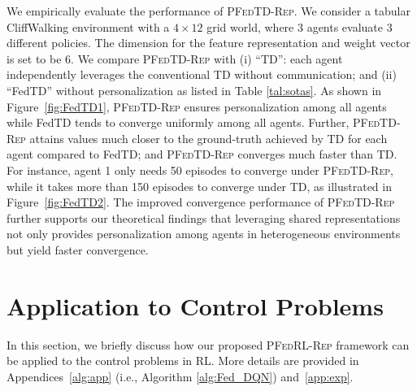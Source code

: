 \documentclass{article} %
\theoremstyle{plain}
\theoremstyle{definition}
\theoremstyle{remark}
\newcommand{\FedRL}{\textsc{PFedRL-Rep}\xspace}
\newcommand{\FedTD}{\textsc{PFedTD-Rep}\xspace}
\begin{document}
{We empirically evaluate the performance of \FedTD. We consider a tabular CliffWalking environment \citep{brockman2016openai} with a $4\times 12$ grid world, where 3 agents evaluate 3 different policies. The dimension for the feature representation and weight vector is set to be $6$. We compare \FedTD with (i) ``TD'': each agent independently leverages the conventional TD without communication; and (ii) ``FedTD'' without personalization \citep{khodadadian2022federated,dal2023federated} as listed in Table \ref{tal:sotas}. As shown in Figure~\ref{fig:FedTD1}, \FedTD ensures personalization among all agents while FedTD tends to converge uniformly among all agents.
Further, \FedTD attains values much closer to the ground-truth achieved by TD for each agent compared to FedTD; and \FedTD converges much faster than TD. For instance, agent 1 only needs 50 episodes to converge under \FedTD, while it takes more than 150 episodes to converge under TD, as illustrated in Figure~\ref{fig:FedTD2}.
The improved convergence performance of \FedTD further supports our theoretical findings that leveraging shared representations not only provides personalization among agents in heterogeneous environments but yield faster convergence.  




  












\section{Application to Control Problems}\label{sec:application}
In this section, we briefly discuss how our proposed \FedRL framework can be applied to the control problems in RL. More details are provided in Appendices~\ref{alg:app} (i.e., Algorithm \ref{alg:Fed_DQN}) and~\ref{app:exp}.



}
\end{document}
